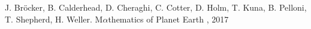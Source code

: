 %
\begin{thebibliography}{99}

J. Br\"{o}cker, B. Calderhead, D. Cheraghi, C. Cotter, D. Holm, T. Kuna, B. Pelloni, T. Shepherd, H. Weller.
\newblock M$\alpha$thematics of Planet Earth
, 2017



\end{thebibliography}
